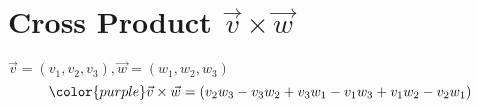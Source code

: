 \section{Cross Product $\vec{v} \times \vec{w}$}
$\vec{v}=(v_1,v_2,v_3),\vec{w}=(w_1,w_2,w_3)$
\begin{equation}
    {\color{purple}\vec{v} \times \vec{w}=(v_2w_3-v_3w_2+v_3w_1-v_1w_3+v_1w_2-v_2w_1)}
\end{equation}
